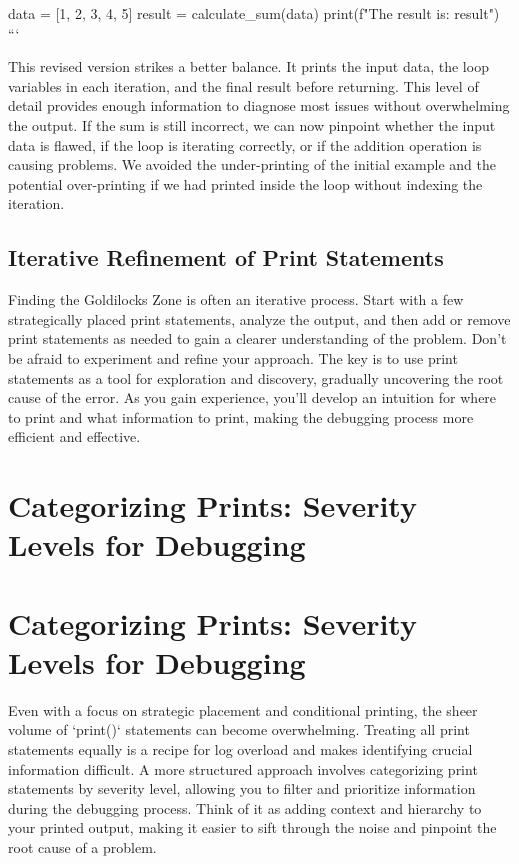 \documentclass{article}
\begin{document}
{{{data = [1, 2, 3, 4, 5]
result = calculate_sum(data)
print(f"The result is: {result}")
```

This revised version strikes a better balance. It prints the input data, the loop variables in each iteration, and the final result before returning. This level of detail provides enough information to diagnose most issues without overwhelming the output. If the sum is still incorrect, we can now pinpoint whether the input data is flawed, if the loop is iterating correctly, or if the addition operation is causing problems. We avoided the under-printing of the initial example and the potential over-printing if we had printed inside the loop without indexing the iteration.

\subsection*{Iterative Refinement of Print Statements}

Finding the Goldilocks Zone is often an iterative process. Start with a few strategically placed print statements, analyze the output, and then add or remove print statements as needed to gain a clearer understanding of the problem.  Don't be afraid to experiment and refine your approach.  The key is to use print statements as a tool for exploration and discovery, gradually uncovering the root cause of the error. As you gain experience, you'll develop an intuition for where to print and what information to print, making the debugging process more efficient and effective.

\newpage

\section*{Categorizing Prints: Severity Levels for Debugging} %
\label{chapter-4-2-Categorizing_Prints__Severity_Levels_for}

\section*{Categorizing Prints: Severity Levels for Debugging}

Even with a focus on strategic placement and conditional printing, the sheer volume of `print()` statements can become overwhelming. Treating all print statements equally is a recipe for log overload and makes identifying crucial information difficult.  A more structured approach involves categorizing print statements by severity level, allowing you to filter and prioritize information during the debugging process. Think of it as adding context and hierarchy to your printed output, making it easier to sift through the noise and pinpoint the root cause of a problem.

}}}
\end{document}
